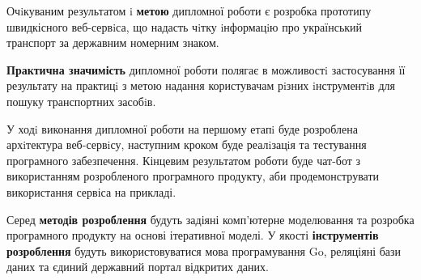 Очiкуваним результатом i \textbf{метою} дипломної роботи є розробка прототипу
швидкісного веб-сервiса, що надасть чiтку iнформацiю про український транспорт
за державним номерним знаком.

\textbf{Практична значимість} дипломної роботи полягає в можливостi
застосування її результату на практицi з метою надання користувачам рiзних
iнструментiв для пошуку транспортних засобiв.

У ходi виконання дипломної роботи на першому етапi буде розроблена
архiтектура веб-сервiсу, наступним кроком буде реалiзацiя та тестування
програмного забезпечення.
Кінцевим результатом роботи буде чат-бот з використанням розробленого
програмного продукту, аби продемонструвати використання сервіса на прикладі.

Серед \textbf{методів розроблення} будуть задіяні комп’ютерне моделювання та розробка програмного
продукту на основі ітеративної моделі. У якості \textbf{інструментів розроблення} будуть використовуватися
мова програмування Go, реляціяні бази даних та
єдиний державний портал відкритих даних.
